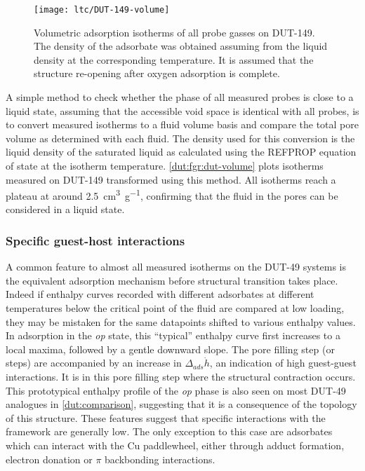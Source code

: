 \begin{figure}[htb]
    \centering
    \texttt{[image: ltc/DUT-149-volume]}%
    \caption{Volumetric adsorption isotherms of all probe gasses
    on DUT-149. The density of the adsorbate was obtained assuming
    from the liquid density at the corresponding temperature.
    It is assumed that the structure re-opening after oxygen
    adsorption is complete.}%
    \label{dut:fgr:dut-volume}
\end{figure}

A simple method to check whether the phase of all measured probes
is close to a liquid state, assuming that the accessible void space 
is identical with all probes, is to convert measured isotherms 
to a fluid volume basis and compare the total pore volume as determined
with each fluid. The density used for this conversion is the 
liquid density of the saturated liquid as calculated using the 
REFPROP equation of state at the isotherm temperature.
\autoref{dut:fgr:dut-volume} plots isotherms measured on DUT-149
transformed using this method. All isotherms reach a plateau at around 
\SI{2.5}{\centi\metre^3\per\gram}, confirming that the fluid in 
the pores can be considered in a liquid state.

\subsubsection{Specific guest-host interactions}

A common feature to almost all measured isotherms on the DUT-49 systems
is the equivalent adsorption mechanism before structural transition 
takes place.
Indeed if enthalpy curves recorded with different adsorbates at different
temperatures below the critical point of the fluid are compared at low 
loading, they may be mistaken for the same datapoints shifted to
various enthalpy values.
In adsorption in the \textit{op} state, this ``typical'' enthalpy 
curve first increases to a local maxima, followed
by a gentle downward slope. The pore filling step (or steps)
are accompanied by an increase in \(\Delta_{ads} \dot{h}\),
an indication of high guest-guest interactions. It is in this 
pore filling step where the structural contraction occurs. 
This prototypical enthalpy profile of the \textit{op} phase 
is also seen on most DUT-49 analogues
in \autoref{dut:comparison}, suggesting that it is a consequence of 
the topology of this structure.
These features suggest that specific interactions with the framework
are generally low. The only 
exception to this case are adsorbates which can interact with the 
Cu paddlewheel, either through adduct formation, 
electron donation or \(\pi\) backbonding interactions. 

